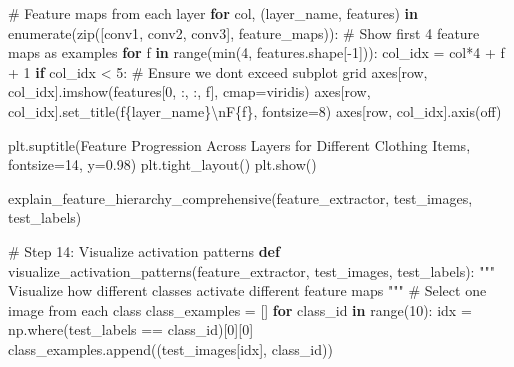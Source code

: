 \documentclass[
  letterpaper,
  DIV=11,
  numbers=noendperiod]{scrreprt}
\newenvironment{Shaded}{\begin{snugshade}}{\end{snugshade}}
\newcommand{\BuiltInTok}[1]{\textcolor[rgb]{0.00,0.23,0.31}{#1}}
\newcommand{\CharTok}[1]{\textcolor[rgb]{0.13,0.47,0.30}{#1}}
\newcommand{\CommentTok}[1]{\textcolor[rgb]{0.37,0.37,0.37}{#1}}
\newcommand{\ControlFlowTok}[1]{\textcolor[rgb]{0.00,0.23,0.31}{\textbf{#1}}}
\newcommand{\DecValTok}[1]{\textcolor[rgb]{0.68,0.00,0.00}{#1}}
\newcommand{\FloatTok}[1]{\textcolor[rgb]{0.68,0.00,0.00}{#1}}
\newcommand{\KeywordTok}[1]{\textcolor[rgb]{0.00,0.23,0.31}{\textbf{#1}}}
\newcommand{\NormalTok}[1]{\textcolor[rgb]{0.00,0.23,0.31}{#1}}
\newcommand{\OperatorTok}[1]{\textcolor[rgb]{0.37,0.37,0.37}{#1}}
\newcommand{\SpecialCharTok}[1]{\textcolor[rgb]{0.37,0.37,0.37}{#1}}
\newcommand{\SpecialStringTok}[1]{\textcolor[rgb]{0.13,0.47,0.30}{#1}}
\newcommand{\StringTok}[1]{\textcolor[rgb]{0.13,0.47,0.30}{#1}}
\begin{document}
\begin{Shaded}
\begin{Highlighting}[]
        \CommentTok{\# Feature maps from each layer}
        \ControlFlowTok{for}\NormalTok{ col, (layer\_name, features) }\KeywordTok{in} \BuiltInTok{enumerate}\NormalTok{(}\BuiltInTok{zip}\NormalTok{([}\StringTok{\textquotesingle{}conv1\textquotesingle{}}\NormalTok{, }\StringTok{\textquotesingle{}conv2\textquotesingle{}}\NormalTok{, }\StringTok{\textquotesingle{}conv3\textquotesingle{}}\NormalTok{], feature\_maps)):}
            \CommentTok{\# Show first 4 feature maps as examples}
            \ControlFlowTok{for}\NormalTok{ f }\KeywordTok{in} \BuiltInTok{range}\NormalTok{(}\BuiltInTok{min}\NormalTok{(}\DecValTok{4}\NormalTok{, features.shape[}\OperatorTok{{-}}\DecValTok{1}\NormalTok{])):}
\NormalTok{                col\_idx }\OperatorTok{=}\NormalTok{ col}\OperatorTok{*}\DecValTok{4} \OperatorTok{+}\NormalTok{ f }\OperatorTok{+} \DecValTok{1}
                \ControlFlowTok{if}\NormalTok{ col\_idx }\OperatorTok{\textless{}} \DecValTok{5}\NormalTok{:  }\CommentTok{\# Ensure we don\textquotesingle{}t exceed subplot grid}
\NormalTok{                  axes[row, col\_idx].imshow(features[}\DecValTok{0}\NormalTok{, :, :, f], cmap}\OperatorTok{=}\StringTok{\textquotesingle{}viridis\textquotesingle{}}\NormalTok{)}
\NormalTok{                  axes[row, col\_idx].set\_title(}\SpecialStringTok{f\textquotesingle{}}\SpecialCharTok{\{}\NormalTok{layer\_name}\SpecialCharTok{\}}\CharTok{\textbackslash{}n}\SpecialStringTok{F}\SpecialCharTok{\{}\NormalTok{f}\SpecialCharTok{\}}\SpecialStringTok{\textquotesingle{}}\NormalTok{, fontsize}\OperatorTok{=}\DecValTok{8}\NormalTok{)}
\NormalTok{                  axes[row, col\_idx].axis(}\StringTok{\textquotesingle{}off\textquotesingle{}}\NormalTok{)}
    
\NormalTok{    plt.suptitle(}\StringTok{\textquotesingle{}Feature Progression Across Layers for Different Clothing Items\textquotesingle{}}\NormalTok{, fontsize}\OperatorTok{=}\DecValTok{14}\NormalTok{, y}\OperatorTok{=}\FloatTok{0.98}\NormalTok{)}
\NormalTok{    plt.tight\_layout()}
\NormalTok{    plt.show()}

\NormalTok{explain\_feature\_hierarchy\_comprehensive(feature\_extractor, test\_images, test\_labels)}

\CommentTok{\# Step 14: Visualize activation patterns}
\KeywordTok{def}\NormalTok{ visualize\_activation\_patterns(feature\_extractor, test\_images, test\_labels):}
    \CommentTok{"""}
\CommentTok{    Visualize how different classes activate different feature maps}
\CommentTok{    """}
    \CommentTok{\# Select one image from each class}
\NormalTok{    class\_examples }\OperatorTok{=}\NormalTok{ []}
    \ControlFlowTok{for}\NormalTok{ class\_id }\KeywordTok{in} \BuiltInTok{range}\NormalTok{(}\DecValTok{10}\NormalTok{):}
\NormalTok{        idx }\OperatorTok{=}\NormalTok{ np.where(test\_labels }\OperatorTok{==}\NormalTok{ class\_id)[}\DecValTok{0}\NormalTok{][}\DecValTok{0}\NormalTok{]}
\NormalTok{        class\_examples.append((test\_images[idx], class\_id))}
    

\end{Highlighting}
\end{Shaded}
\end{document}
